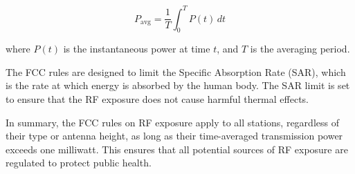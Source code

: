 \[
P_{\text{avg}} = \frac{1}{T} \int_{0}^{T} P(t) \, dt
\]

where \( P(t) \) is the instantaneous power at time \( t \), and \( T \) is the averaging period.

The FCC rules are designed to limit the Specific Absorption Rate (SAR), which is the rate at which energy is absorbed by the human body. The SAR limit is set to ensure that the RF exposure does not cause harmful thermal effects.

In summary, the FCC rules on RF exposure apply to all stations, regardless of their type or antenna height, as long as their time-averaged transmission power exceeds one milliwatt. This ensures that all potential sources of RF exposure are regulated to protect public health.

